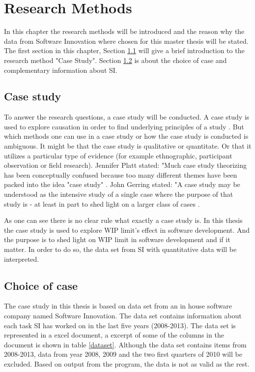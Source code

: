 \documentclass[UKenglish]{ifimaster}  %
\begin{document}
\chapter{Research Methods}
\label{chap:RM}
In this chapter the research methods will be introduced and the reason why the data from Software Innovation where chosen for this master thesis will be stated. The first section in this chapter, Section \ref{sec:CS} will give a brief introduction to the research method "Case Study".  Section \ref{sec:coc} is about the choice of case and complementary information about SI. 


\section{Case study}
\label{sec:CS}
To answer the research questions, a case study will be conducted.  A case study is used to explore causation in order to find underlying principles of a study \parencite{0078285763}\parencite{9781412960991}.  But which methods one can use in a case study or how the case study is conducted is ambiguous.  It might be that the case study is qualitative or quantitate.  Or that it utilizes a particular type of evidence (for example ethnographic, participant observation or field research).  Jennifer Platt stated: "Much case study theorizing has been conceptually confused because too many different themes have been packed into the idea "case study" \parencite{0521676568}.  John Gerring stated: "A case study may be understood as the intensive study of a single case where the purpose of that study is - at least in part to shed light on a larger class of cases  \parencite{0521676568}.



As one can see there is no clear rule what exactly a case study is. In this thesis the case study is used to explore WIP limit's effect in software development.  And the purpose is to shed light on WIP limit in software development and if it matter. In order to do so, the data set from SI with quantitative data will be interpreted.

\section{Choice of case}
\label{sec:coc}
The case study in this thesis is based on data set from an in house software company named Software Innovation. The data set contains information about each task SI has worked on in the last five years (2008-2013). The data set is represented in a excel document, a excerpt of some of the columns in the document is shown in table \ref{dataset}. Although the data set contains items from 2008-2013, data from year 2008, 2009 and the two first quarters of 2010 will be excluded. Based on output from the program, the data is not as valid as the rest. 
\end{document}
